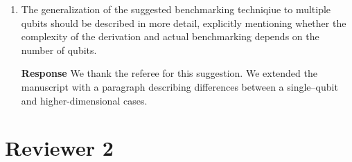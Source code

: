\documentclass[a4paper,12pt]{article}
\newcommand{\1}{{\rm 1\hspace{-0.9mm}l}}
\newenvironment{response}{\vspace{1em}\noindent\textbf{Response}}{\vspace{1em}}
\begin{document}
\begin{enumerate}
    \begin{response}
      We modified manuscript to include mention of cross-entropy benchmarking
      as suggested by the referee.
    \end{response}
  \item The generalization of the suggested benchmarking techniqiue to multiple
    qubits should be described in more detail, explicitly mentioning whether
    the complexity of the derivation and actual benchmarking depends on the
    number of qubits.

    \begin{response}
      We thank the referee for this suggestion. We extended the manuscript with
      a paragraph describing differences between a single--qubit and
      higher-dimensional cases.
    \end{response}

\end{enumerate}
\section{Reviewer 2}
\end{document}
